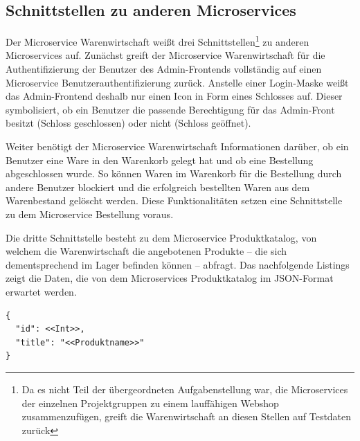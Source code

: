 \subsection{Schnittstellen zu anderen Microservices}
\label{subsec: Schnittstellen zu anderen Microservices}
Der Microservice Warenwirtschaft weißt drei Schnittstellen\footnote{Da es nicht Teil der übergeordneten Aufgabenstellung war, die Microservices der einzelnen Projektgruppen zu einem lauffähigen Webshop zusammenzufügen, greift die Warenwirtschaft an diesen Stellen auf Testdaten zurück} zu anderen Microservices auf. Zunächst greift der Microservice Warenwirtschaft für die Authentifizierung der Benutzer des Admin-Frontends vollständig auf einen Microservice Benutzerauthentifizierung zurück. Anstelle einer Login-Maske weißt das Admin-Frontend deshalb nur einen Icon in Form eines Schlosses auf. Dieser symbolisiert, ob ein Benutzer die passende Berechtigung für das Admin-Front besitzt (Schloss geschlossen) oder nicht (Schloss geöffnet). \par
Weiter benötigt der Microservice Warenwirtschaft Informationen darüber, ob ein Benutzer eine Ware in den Warenkorb gelegt hat und ob eine Bestellung abgeschlossen wurde. So können Waren im Warenkorb für die Bestellung durch andere Benutzer blockiert und die erfolgreich bestellten Waren aus dem Warenbestand gelöscht werden. Diese Funktionalitäten setzen eine Schnittstelle zu dem Microservice Bestellung voraus. \par 
Die dritte Schnittstelle besteht zu dem Microservice Produktkatalog, von welchem die Warenwirtschaft die angebotenen Produkte -- die sich dementsprechend im Lager befinden können -- abfragt. Das nachfolgende Listings zeigt die Daten, die von dem  Microservices Produktkatalog im JSON-Format erwartet werden. 

\begin{lstlisting}[caption=Datenabfrage aus dem Produktkatalog]
{
  "id": <<Int>>,
  "title": "<<Produktname>>"
}
\end{lstlisting}


\newpage
